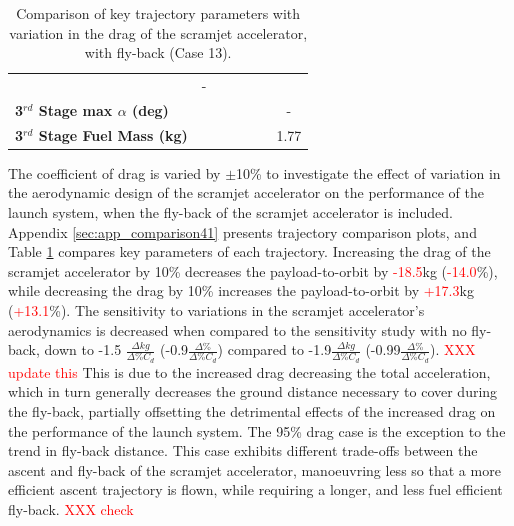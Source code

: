 \begin{table}[ht]
\begin{tabular}{l c c c c c c}
		& -
		\\
		\textbf{3$^{rd}$ Stage max $\alpha$ (deg)}
		& \thirdmaxAoACdNinety
		& \thirdmaxAoACdNinetyFive
		& \thirdmaxAoACdStandard
		& \thirdmaxAoACdOneHundredFive
		& \thirdmaxAoACdOneHundredTen
		& -
		\\
		\textbf{3$^{rd}$ Stage Fuel Mass (kg)}
		& \thirdmFuelCdNinety
		& \thirdmFuelCdNinetyFive
		& \thirdmFuelCdStandard
		& \thirdmFuelCdOneHundredFive
		& \thirdmFuelCdOneHundredTen
		&1.77
		\\
		\hline 
	\end{tabular} 
	\caption{Comparison of key trajectory parameters with variation in the drag of the scramjet accelerator, with fly-back (Case 13).}
	\label{tab:comparison41}
\end{table}


The coefficient of drag is varied by $\pm$10\% to investigate the effect of variation in the aerodynamic design of the scramjet accelerator on the performance of the launch system, when the fly-back of the scramjet accelerator is included. Appendix \ref{sec:app_comparison41} presents trajectory comparison plots, and Table \ref{tab:comparison41} compares key parameters of each trajectory. 
Increasing the drag of the scramjet accelerator by 10\% decreases the payload-to-orbit by \textcolor{red}{-18.5}kg (\textcolor{red}{-14.0}\%), while decreasing the drag by 10\% increases the payload-to-orbit by \textcolor{red}{+17.3}kg (\textcolor{red}{+13.1}\%). 
The sensitivity to variations in the scramjet accelerator's aerodynamics is decreased when compared to the sensitivity study with no fly-back, down to -1.5 $\frac{\Delta kg}{\Delta\% C_{d}}$ (-0.9$\frac{\Delta \%}{\Delta\% C_{d}}$) compared to -1.9$\frac{\Delta kg}{\Delta\% C_{d}}$  (-0.99$\frac{\Delta \%}{\Delta\% C_{d}}$). \textcolor{red}{XXX update this}
This is due to the increased drag decreasing the total acceleration, which in turn generally decreases the ground distance necessary to cover during the fly-back, partially offsetting the detrimental effects of the increased drag on the performance of the launch system. The 95\% drag case is the exception to the trend in fly-back distance. This case exhibits different trade-offs between the ascent and fly-back of the scramjet accelerator, manoeuvring less so that a more efficient ascent trajectory is flown, while requiring a longer, and less fuel efficient fly-back. \textcolor{red}{XXX check}

